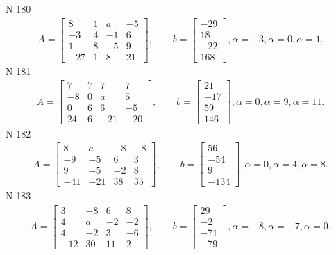 \documentclass[11pt]{report}
\begin{document}
N 180
\begin{align*}
 A = \left[\begin{matrix}8 & 1 & a & -5\\-3 & 4 & -1 & 6\\1 & 8 & -5 & 9\\-27 & 1 & 8 & 21\end{matrix}\right],
    \qquad b = \left[\begin{matrix}-29\\18\\-22\\168\end{matrix}\right], \alpha = -3, \alpha = 0, \alpha = 1. 
 \end{align*}
N 181
\begin{align*}
 A = \left[\begin{matrix}7 & 7 & 7 & 7\\-8 & 0 & a & 5\\0 & 6 & 6 & -5\\24 & 6 & -21 & -20\end{matrix}\right],
    \qquad b = \left[\begin{matrix}21\\-17\\59\\146\end{matrix}\right], \alpha = 0, \alpha = 9, \alpha = 11. 
 \end{align*}
N 182
\begin{align*}
 A = \left[\begin{matrix}8 & a & -8 & -8\\-9 & -5 & 6 & 3\\9 & -5 & -2 & 8\\-41 & -21 & 38 & 35\end{matrix}\right],
    \qquad b = \left[\begin{matrix}56\\-54\\9\\-134\end{matrix}\right], \alpha = 0, \alpha = 4, \alpha = 8. 
 \end{align*}
N 183
\begin{align*}
 A = \left[\begin{matrix}3 & -8 & 6 & 8\\4 & a & -2 & -2\\4 & -2 & 3 & -6\\-12 & 30 & 11 & 2\end{matrix}\right],
    \qquad b = \left[\begin{matrix}29\\-2\\-71\\-79\end{matrix}\right], \alpha = -8, \alpha = -7, \alpha = 0. 
 \end{align*}
\end{document}
